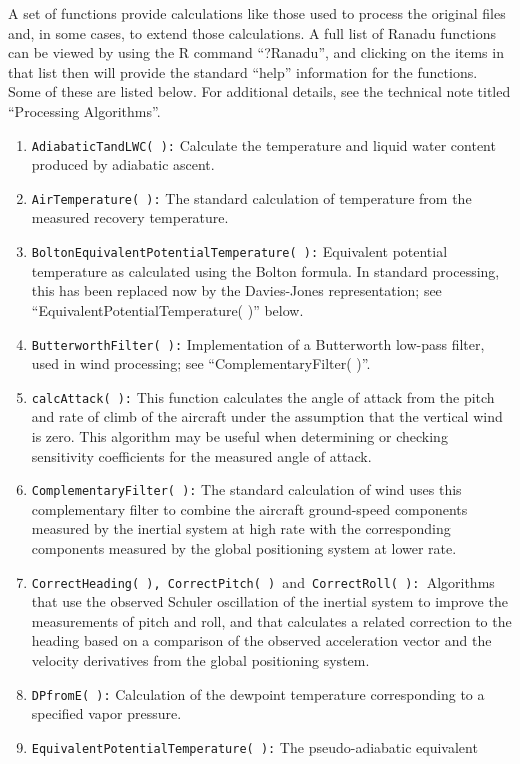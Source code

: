 \documentclass[12pt,english]{report}\usepackage[]{graphicx}\usepackage[]{color}
\begin{document}
A set of functions provide calculations like those used to process
the original files and, in some cases, to extend those calculations.
A full list of Ranadu functions can be viewed by using the R command
``?Ranadu'', and clicking on the items in that list then will provide
the standard ``help'' information for the functions. Some of these
are listed below. For additional details, see the technical note titled
``Processing Algorithms''.
\begin{enumerate}
\item \texttt{AdiabaticTandLWC( ):} Calculate the temperature and liquid
water content produced by adiabatic ascent.
\item \texttt{AirTemperature( ):} The standard calculation of temperature
from the measured recovery temperature.
\item \texttt{BoltonEquivalentPotentialTemperature( ):} Equivalent potential
temperature as calculated using the Bolton formula. In standard processing,
this has been replaced now by the Davies-Jones representation; see
``EquivalentPotentialTemperature( )'' below.
\item \texttt{ButterworthFilter( ):} Implementation of a Butterworth low-pass
filter, used in wind processing; see ``ComplementaryFilter( )''.
\item \texttt{calcAttack( ):} This function calculates the angle of attack
from the pitch and rate of climb of the aircraft under the assumption
that the vertical wind is zero. This algorithm may be useful when
determining or checking sensitivity coefficients for the measured
angle of attack.
\item \texttt{ComplementaryFilter( ):} The standard calculation of wind
uses this complementary filter to combine the aircraft ground-speed
components measured by the inertial system at high rate with the corresponding
components measured by the global positioning system at lower rate.
\item \texttt{CorrectHeading( ), CorrectPitch( ) }and\texttt{ CorrectRoll(
): }Algorithms that use the observed Schuler oscillation of the inertial
system to improve the measurements of pitch and roll, and that calculates
a related correction to the heading based on a comparison of the observed
acceleration vector and the velocity derivatives from the global positioning
system.
\item \texttt{DPfromE( ):} Calculation of the dewpoint temperature corresponding
to a specified vapor pressure.
\item \texttt{EquivalentPotentialTemperature( ):} The pseudo-adiabatic equivalent

\end{enumerate}
\end{document}
